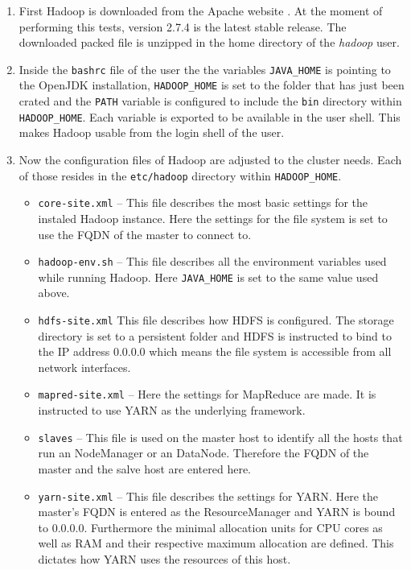 \begin{enumerate}
    \item First Hadoop is downloaded from the Apache website . 
    At the moment of performing this tests, 
    version 2.7.4 is the latest stable release.
    The downloaded packed file is unzipped in the home directory of the \emph{hadoop} user.
    \item Inside the \texttt{bashrc} file of the user the the variables \texttt{JAVA\_HOME} is pointing to the OpenJDK installation,
    \texttt{HADOOP\_HOME} is set to the folder that has just been crated and the \texttt{PATH} variable is configured to include the \texttt{bin} directory within \texttt{HADOOP\_HOME}.
    Each variable is exported to be available in the user shell.
    This makes Hadoop usable from the login shell of the user.
    \item Now the configuration files of Hadoop are adjusted to the cluster needs. Each of those resides in the \texttt{etc/hadoop} directory within \texttt{HADOOP\_HOME}.
    \begin{itemize}
        \item \texttt{core-site.xml} -- This file describes the most basic settings for the instaled Hadoop instance. 
        Here the settings for the file system is set to use the \ac{FQDN} of the master to connect to.
        \item \texttt{hadoop-env.sh} -- This file describes all the environment variables used while running Hadoop. 
        Here \texttt{JAVA\_HOME} is set to the same value used above.
        \item \texttt{hdfs-site.xml} This file describes how \ac{HDFS} is configured. 
        The storage directory is set to a persistent folder
        and \ac{HDFS} is instructed to bind to the \ac{IP} address 0.0.0.0 
        which means the file system is accessible from all network interfaces.
        \item \texttt{mapred-site.xml} -- Here the settings for MapReduce are made. 
        It is instructed to use \ac{YARN} as the underlying framework.
        \item \texttt{slaves} -- This file is used on the master host to identify all the hosts 
        that run an NodeManager or an DataNode.
        Therefore the \acs{FQDN} of the master and the salve host are entered here.
        \item \texttt{yarn-site.xml} -- This file describes the settings for \ac{YARN}. Here the master's \ac{FQDN} is entered as the ResourceManager and \ac{YARN} is bound to 0.0.0.0. 
        Furthermore the minimal allocation units for \ac{CPU} cores 
        as well as \ac{RAM} and their respective maximum allocation are defined. 
        This dictates how \ac{YARN} uses the resources of this host.
    \end{itemize}
\end{enumerate}

